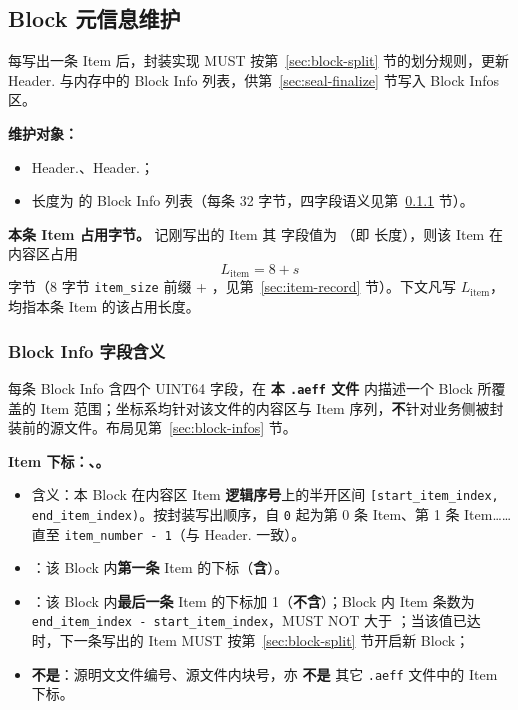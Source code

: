 \subsection{Block 元信息维护}\label{sec:block-meta}
每写出一条 Item 后，封装实现 MUST 按第~\ref{sec:block-split} 节的划分规则，更新 Header. 与内存中的 Block Info 列表，供第~\ref{sec:seal-finalize} 节写入 Block Infos 区。

\textbf{维护对象：}
\begin{itemize}
  \item Header.、Header.；
  \item 长度为  的 Block Info 列表（每条 32 字节，四字段语义见第~\ref{sec:block-meta-fields} 节）。
\end{itemize}

\textbf{本条 Item 占用字节。} 记刚写出的 Item 其  字段值为 （即  长度），则该 Item 在内容区占用
\[
  L_{\mathrm{item}} = 8 + s
\]
字节（8 字节 \texttt{item\_size} 前缀 + ，见第~\ref{sec:item-record} 节）。下文凡写 $L_{\mathrm{item}}$，均指本条 Item 的该占用长度。

\subsubsection{Block Info 字段含义}\label{sec:block-meta-fields}
每条 Block Info 含四个 UINT64 字段，在 \textbf{本 \texttt{.aeff} 文件} 内描述一个 Block 所覆盖的 Item 范围；坐标系均针对该文件的内容区与 Item 序列，\textbf{不}针对业务侧被封装前的源文件。布局见第~\ref{sec:block-infos} 节。

\textbf{Item 下标：、。}
\begin{itemize}
  \item 含义：本 Block 在内容区 Item \textbf{逻辑序号}上的半开区间 \texttt{[start\_item\_index, end\_item\_index)}。按封装写出顺序，自 \texttt{0} 起为第 0 条 Item、第 1 条 Item……直至 \texttt{item\_number - 1}（与 Header. 一致）。
  \item {}：该 Block 内\textbf{第一条} Item 的下标（\textbf{含}）。
  \item {}：该 Block 内\textbf{最后一条} Item 的下标加 1（\textbf{不含}）；Block 内 Item 条数为 \texttt{end\_item\_index - start\_item\_index}，MUST NOT 大于 ；当该值已达  时，下一条写出的 Item MUST 按第~\ref{sec:block-split} 节开启新 Block；
  \item \textbf{不是}：源明文文件编号、源文件内块号，亦 \textbf{不是} 其它 \texttt{.aeff} 文件中的 Item 下标。
\end{itemize}

